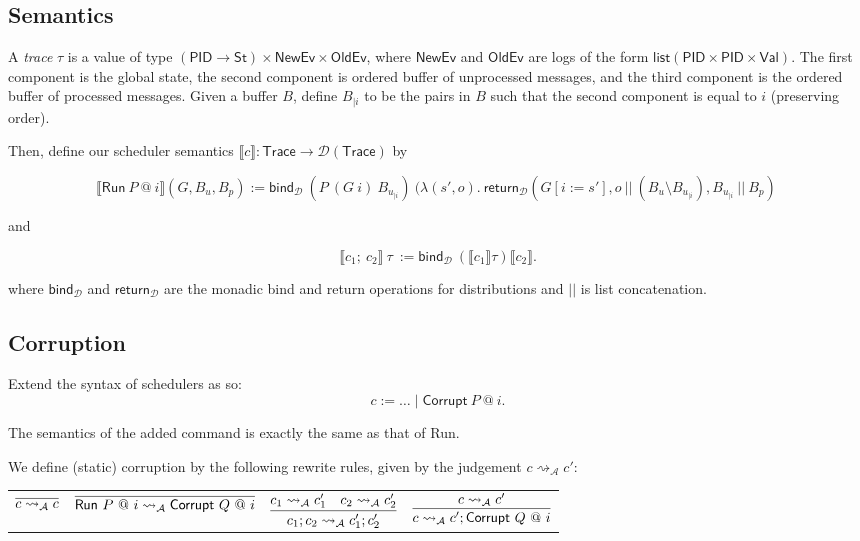 \documentclass{article}
\newcommand{\Val}{\mathsf{Val}}
\newcommand{\St}{\mathsf{St}}
\newcommand{\PID}{\mathsf{PID}}
\newcommand{\List}{\mathsf{list}}
\newcommand{\D}{\mathcal{D}}
\newcommand{\NewEv}{\mathsf{NewEv}}
\newcommand{\OldEv}{\mathsf{OldEv}}
\begin{document}
\subsection{Semantics}

A \emph{trace} $\tau$ is a value of type $(\PID \to \St) \times \NewEv \times \OldEv$, where $\NewEv$ and $\OldEv$ are logs of the form $\List (\PID \times \PID \times \Val)$. The first component is the global state, the second component is ordered buffer of unprocessed messages, and the third component is the ordered buffer of processed messages. Given a buffer $B$, define $B_{| i}$ to be the pairs in $B$ such that the second component is equal to $i$ (preserving order).

Then, define our scheduler semantics $\llbracket c \rrbracket : \textsf{Trace} \to \D(\textsf{Trace})$ by

\[\llbracket \textsf{Run}\ P\ @\ i \rrbracket (G, B_u, B_p) := \textsf{bind}_{\D}\ (P\ (G\ i)\ B_{u_{| i}})\ (\lambda (s', o).\ \textsf{return}_{\D} (G[i := s'], o\ ||\ (B_u \setminus B_{u_{| i}}), B_{u_{| i}}\ ||\ B_p)\ \]

and

\[\llbracket c_1;\ c_2 \rrbracket\ \tau\ := \textsf{bind}_{\D}\ (\llbracket c_1 \rrbracket \tau) \llbracket c_2 \rrbracket.\]

where $\textsf{bind}_{\D}$ and $\textsf{return}_{\D}$ are the monadic bind and return operations for distributions and $||$ is list concatenation.

\subsection{Corruption}

Extend the syntax of schedulers as so:
\[ c := \dots \mid \textsf{Corrupt}\ P\ @\ i.\]

The semantics of the added command is exactly the same as that of \textsf{Run}.

We define (static) corruption by the following rewrite rules, given by the judgement $c \rightsquigarrow_{\mathcal{A}} c'$:

\begin{tabular}{cccc}
    $\infer{c \rightsquigarrow_{\mathcal{A}} c}{}$ & 
    $\infer{\textsf{Run}\ P\ @\ i \rightsquigarrow_{\mathcal{A}} \textsf{Corrupt}\ Q\ @\ i}{}$ &
    $\infer{c_1;c_2 \rightsquigarrow_{\mathcal{A}} c_1'; c_2'} {c_1 \rightsquigarrow_\mathcal{A} c_1' & c_2 \rightsquigarrow_\mathcal{A} c_2'}$ &
    $\infer{c \rightsquigarrow_{\mathcal{A}} c'; \textsf{Corrupt}\ Q\ @\ i}{c \rightsquigarrow_\mathcal{A} c'}$ \\
\end{tabular}
\end{document}

